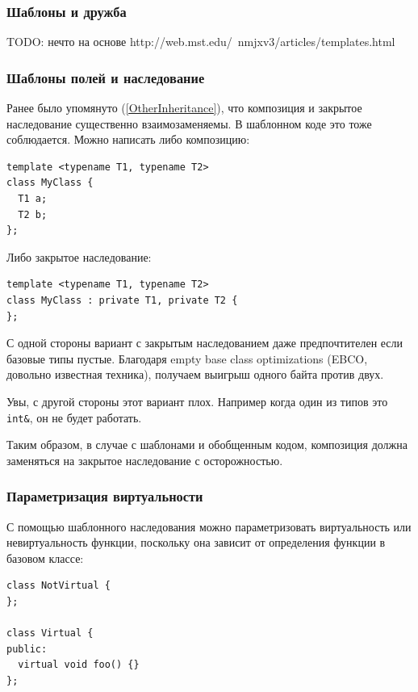 \documentclass[a4paper,12pt,oneside]{article}
\begin{document}
\subsubsection{Шаблоны и дружба}

TODO: нечто на основе http://web.mst.edu/~nmjxv3/articles/templates.html

\subsubsection{Шаблоны полей и наследование}\label{TemplPrivate}

Ранее было упомянуто (\ref{OtherInheritance}), что композиция и закрытое наследование существенно взаимозаменяемы. В шаблонном коде это тоже соблюдается. Можно написать либо композицию:

\begin{lstlisting}
template <typename T1, typename T2> 
class MyClass { 
  T1 a; 
  T2 b; 
}; 
\end{lstlisting}

Либо закрытое наследование:

\begin{lstlisting}
template <typename T1, typename T2> 
class MyClass : private T1, private T2 { 
}; 
\end{lstlisting}

С одной стороны вариант с закрытым наследованием даже предпочтителен если базовые типы пустые. Благодаря empty base class optimizations (EBCO, довольно известная техника), получаем выигрыш одного байта против двух.

Увы, с другой стороны этот вариант плох. Например когда один из типов это \lstinline!int&!, он не будет работать.

Таким образом, в случае с шаблонами и обобщенным кодом, композиция должна заменяться на закрытое наследование с осторожностью.

\subsubsection{Параметризация виртуальности}

С помощью шаблонного наследования можно параметризовать виртуальность или невиртуальность функции, поскольку она зависит от определения функции в базовом классе:

\begin{lstlisting}
class NotVirtual { 
}; 

class Virtual { 
public: 
  virtual void foo() {} 
}; 
\end{lstlisting}
\end{document}
